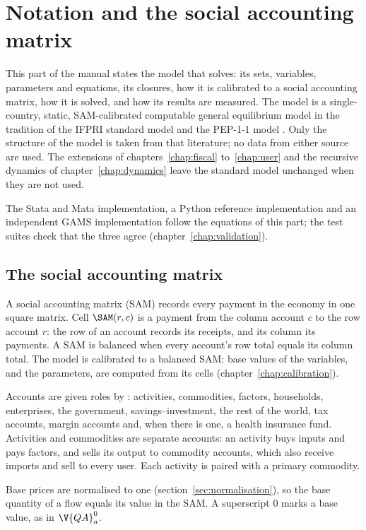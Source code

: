 \chapter{Notation and the social accounting matrix}\label{chap:notation}

This part of the manual states the model that \pkg solves: its sets,
variables, parameters and equations, its closures, how it is calibrated to a
social accounting matrix, how it is solved, and how its results are measured.
The model is a single-country, static, SAM-calibrated computable general
equilibrium model in the tradition of the IFPRI standard model
\citep{lofgren2002} and the PEP-1-1 model \citep{decaluwe2013}. Only the
structure of the model is taken from that literature; no data from either
source are used. The extensions of chapters~\ref{chap:fiscal}
to~\ref{chap:user} and the recursive dynamics of chapter~\ref{chap:dynamics}
leave the standard model unchanged when they are not used.

The Stata and Mata implementation, a Python reference implementation and an
independent GAMS implementation follow the equations of this part; the test
suites check that the three agree (chapter~\ref{chap:validation}).

\section{The social accounting matrix}\label{sec:sam-conventions}

A social accounting matrix (SAM) records every payment in the economy in one
square matrix. Cell $\SAM(r, c)$ is a payment from the column account $c$ to
the row account $r$: the row of an account records its receipts, and its
column its payments. A SAM is balanced when every account's row total equals
its column total. The model is calibrated to a balanced SAM: base values of the
variables, and the parameters, are computed from its cells
(chapter~\ref{chap:calibration}).

Accounts are given roles by : activities, commodities,
factors, households, enterprises, the government, savings--investment, the
rest of the world, tax accounts, margin accounts and, when there is one, a
health insurance fund. Activities and commodities are separate accounts: an
activity buys inputs and pays factors, and sells its output to commodity
accounts, which also receive imports and sell to every user. Each activity is
paired with a primary commodity.

Base prices are normalised to one (section~\ref{sec:normalisation}), so the
base quantity of a flow equals its value in the SAM. A superscript $0$ marks a
base value, as in $\V{QA}^0_a$.


